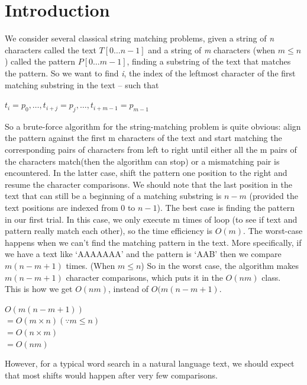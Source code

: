 \documentclass{article}
\begin{document}
\section{\textbf{Introduction}}
\indent We consider several classical string matching problems, given a string of \textit{n} characters called the text $T[0 \ldots n-1]$ and a string of \textit{m} characters (when $m \le n$) called the pattern $P[0 \ldots m-1]$, finding a substring of the text that matches the pattern. So we want to find \textit{i}, the index of the leftmost character of the first matching substring in the text – such that
\begin{center}
$t_i = p_0, \ldots , t_{i+j} = p_j, \ldots , t_{i+m-1} = p_{m-1}$ 
\end{center}
\indent So a brute-force algorithm for the string-matching problem is quite obvious: align the pattern against the first m characters of the text and start matching the corresponding pairs of characters from left to right until either all the m pairs of the characters match(then the algorithm can stop) or a mismatching pair is encountered. In the latter case, shift the pattern one position to the right and resume the character comparisons. We should note that the last position in the text that can still be a beginning of a matching substring is $n-m$ (provided the text positions are indexed from $0$ to $n-1$). The best case is finding the pattern in our first trial. In this case, we only execute m times of loop (to see if text and pattern really match each other), so the time efficiency is $O(m)$. The worst-case happens when we can't find the matching pattern in the text. More specifically, if we have a text like `AAAAAAA' and the pattern is `AAB' then we compare $m(n-m+1)$ times. (When $m \le n$) So in the worst case, the algorithm makes $m(n-m+1)$ character comparisons, which puts it in the $O(nm)$ class. \\
This is how we get $O(nm)$, instead of $O(m(n-m+1)$.
\begin{center}
$O(m(n-m+1))$ \\
$= O(m \times n) (\because{ m \le n})$ \\
$= O(n \times m)$ \\
$= O(nm)$ \\ 
\end{center} 
However, for a typical word search in a natural language text, we should expect that most shifts would happen after very few comparisons. 
\end{document}
